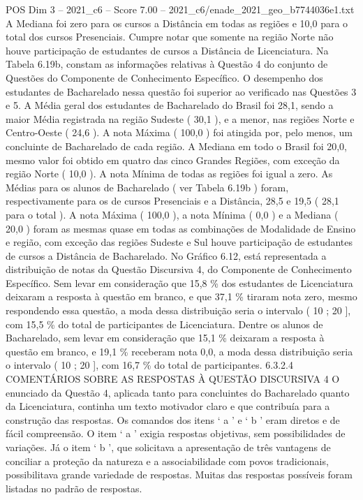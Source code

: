 \begin{textsample}{POS Dim 3 – 2021\_c6 – Score 7.00 – 2021\_c6/enade\_2021\_geo\_b7744036e1.txt}
A Mediana foi zero para os cursos a Distância em todas as regiões e 10,0 para o total dos cursos Presenciais.
Cumpre notar que somente na região Norte não houve participação de estudantes de cursos a Distância de Licenciatura.
Na Tabela 6.19b, constam as informações relativas à Questão 4 do conjunto de Questões do Componente de Conhecimento Específico.
O desempenho dos estudantes de Bacharelado nessa questão foi superior ao verificado nas Questões 3 e 5.
A Média geral dos estudantes de Bacharelado do Brasil foi 28,1, sendo a maior Média registrada na região Sudeste ( 30,1 ), e a menor, nas regiões Norte e Centro-Oeste ( 24,6 ).
A nota Máxima ( 100,0 ) foi atingida por, pelo menos, um concluinte de Bacharelado de cada região.
A Mediana em todo o Brasil foi 20,0, mesmo valor foi obtido em quatro das cinco Grandes Regiões, com exceção da região Norte ( 10,0 ).
A nota Mínima de todas as regiões foi igual a zero.
As Médias para os alunos de Bacharelado ( ver Tabela 6.19b ) foram, respectivamente para os de cursos Presenciais e a Distância, 28,5 e 19,5 ( 28,1 para o total ).
A nota Máxima ( 100,0 ), a nota Mínima ( 0,0 ) e a Mediana ( 20,0 ) foram as mesmas quase em todas as combinações de Modalidade de Ensino e região, com exceção das regiões Sudeste e Sul houve participação de estudantes de cursos a Distância de Bacharelado.
No Gráfico 6.12, está representada a distribuição de notas da Questão Discursiva 4, do Componente de Conhecimento Específico.
Sem levar em consideração que 15,8 \% dos estudantes de Licenciatura deixaram a resposta à questão em branco, e que 37,1 \% tiraram nota zero, mesmo respondendo essa questão, a moda dessa distribuição seria o intervalo ( 10 ; 20 ], com 15,5 \% do total de participantes de Licenciatura.
Dentre os alunos de Bacharelado, sem levar em consideração que 15,1 \% deixaram a resposta à questão em branco, e 19,1 \% receberam nota 0,0, a moda dessa distribuição seria o intervalo ( 10 ; 20 ], com 16,7 \% do total de participantes. 6.3.2.4 COMENTÁRIOS SOBRE AS RESPOSTAS À QUESTÃO DISCURSIVA 4 O enunciado da Questão 4, aplicada tanto para concluintes do Bacharelado quanto da Licenciatura, continha um texto motivador claro e que contribuía para a construção das respostas.
Os comandos dos itens ‘ a ’ e ‘ b ’ eram diretos e de fácil compreensão.
O item ‘ a ’ exigia respostas objetivas, sem possibilidades de variações.
Já o item ‘ b ’, que solicitava a apresentação de três vantagens de conciliar a proteção da natureza e a associabilidade com povos tradicionais, possibilitava grande variedade de respostas.
Muitas das respostas possíveis foram listadas no padrão de respostas.

\end{textsample}
